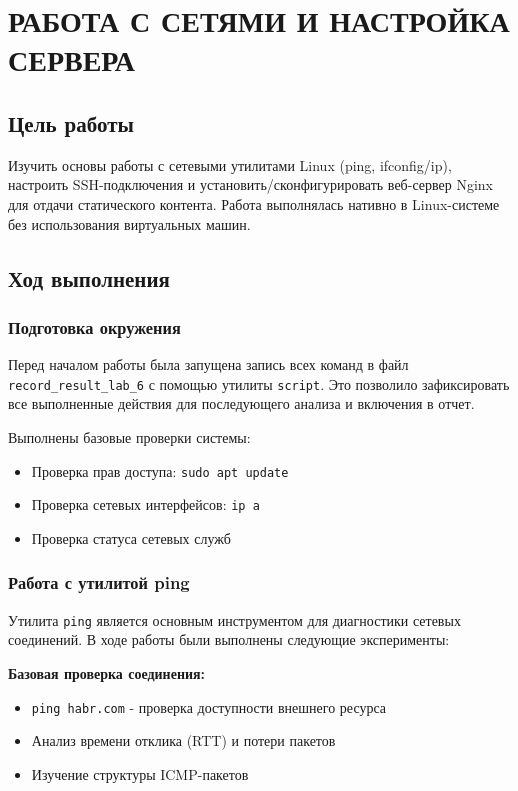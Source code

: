 \chapter{РАБОТА С СЕТЯМИ И НАСТРОЙКА СЕРВЕРА}

\section{Цель работы}
Изучить основы работы с сетевыми утилитами Linux (ping, ifconfig/ip), настроить SSH-подключения и установить/сконфигурировать веб-сервер Nginx для отдачи статического контента. Работа выполнялась нативно в Linux-системе без использования виртуальных машин.

\section{Ход выполнения}

\subsection{Подготовка окружения}
Перед началом работы была запущена запись всех команд в файл \texttt{record\_result\_lab\_6} с помощью утилиты \texttt{script}. Это позволило зафиксировать все выполненные действия для последующего анализа и включения в отчет.

Выполнены базовые проверки системы:
\begin{itemize}
    \item Проверка прав доступа: \texttt{sudo apt update}
    \item Проверка сетевых интерфейсов: \texttt{ip a}
    \item Проверка статуса сетевых служб
\end{itemize}

\subsection{Работа с утилитой ping}
Утилита \texttt{ping} является основным инструментом для диагностики сетевых соединений. В ходе работы были выполнены следующие эксперименты:

\textbf{Базовая проверка соединения:}
\begin{itemize}
    \item \texttt{ping habr.com} - проверка доступности внешнего ресурса
    \item Анализ времени отклика (RTT) и потери пакетов
    \item Изучение структуры ICMP-пакетов
\end{itemize}

